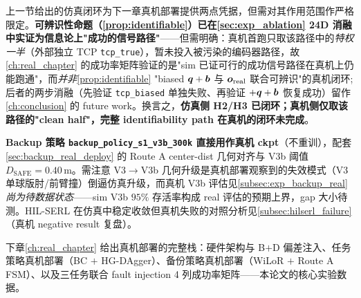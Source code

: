 上一节给出的仿真闭环为下一章真机部署提供两点凭据，但需对其作用范围作严格限定。\textbf{可辨识性命题（\cref{prop:identifiable}）已在\cref{sec:exp_ablation} 24D 消融中实证为信息论上"成功的信号路径"}——但需明确：真机首跑只取该路径中的\emph{特权一半}（外部独立 TCP \texttt{tcp\_true}），暂未投入被污染的编码器路径，故\cref{ch:real_chapter} 的成功率矩阵验证的是"sim 已证可行的成功信号路径在真机上仍能跑通"，而\emph{并非}\cref{prop:identifiable} "biased $\bm{q}+\bm{b}$ 与 $\bm{o}_\text{real}$ 联合可辨识"的真机闭环;后者的两步消融（先验证 \texttt{tcp\_biased} 单独失败、再验证 $+\bm{q}+\bm{b}$ 恢复成功）留作\cref{ch:conclusion} 的 future work。换言之，\textbf{仿真侧 H2/H3 已闭环；真机侧仅取该路径的"clean half"，完整 identifiability path 在真机的闭环未完成}。

\textbf{Backup 策略 \texttt{backup\_policy\_s1\_v3b\_300k} 直接用作真机 ckpt}（不重训），配套\cref{sec:backup_real_deploy} 的 Route A center-dist 几何对齐与 V3b 阈值 $D_\text{SAFE} = 0.40$\,m。需注意 V3$\to$V3b 几何升级是真机部署观察到的失效模式（V3 单球版肘/前臂撞）倒逼仿真升级，而真机 V3b 评估见\cref{subsec:exp_backup_real}\emph{尚为待数据状态}——sim V3b $95\%$ 存活率构成 real 评估的预期上界，gap 大小待测。HIL-SERL 在仿真中稳定收敛但真机失败的对照分析见\cref{subsec:hilserl_failure}（真机 negative result 复盘）。

下章\cref{ch:real_chapter} 给出真机部署的完整栈：硬件架构与 B$+$D 偏差注入、任务策略真机部署（BC $+$ HG-DAgger）、备份策略真机部署（WiLoR $+$ Route A FSM）、以及三任务联合 fault injection 4 列成功率矩阵——本论文的核心实验数据。
